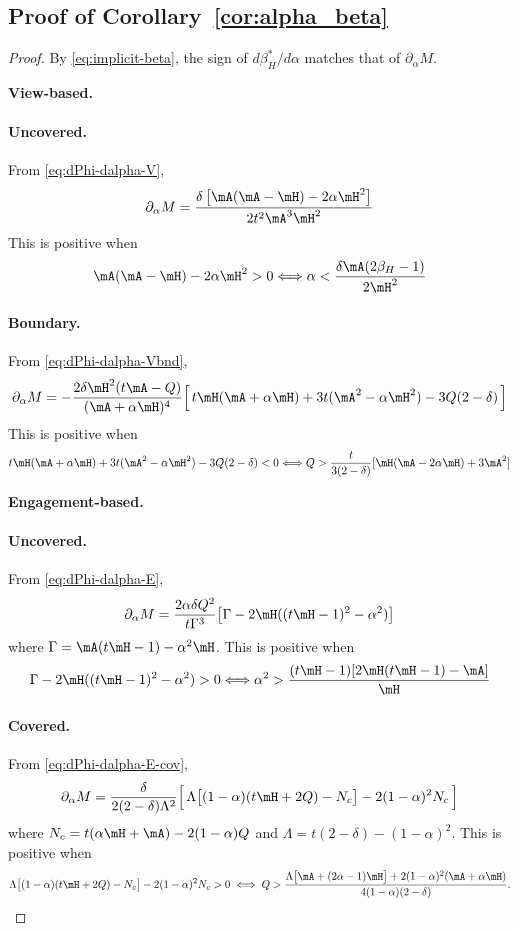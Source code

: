 \subsection*{Proof of Corollary~\ref{cor:alpha_beta}}
\begin{proof}
By \eqref{eq:implicit-beta}, the sign of $d\beta_H^*/d\alpha$ matches
that of $\partial_\alpha M$.


\textbf{View-based.}
\paragraph{Uncovered.} From \eqref{eq:dPhi-dalpha-V},
\[
\partial_\alpha M = \frac{\delta\left[\mA(\mA - \mH) - 2\alpha\mH^2\right]}{2t^2\mA^3\mH^2}
\]
This is positive when
\[
\mA(\mA-\mH) - 2\alpha\mH^2 > 0 \Longleftrightarrow \alpha < \frac{\delta\mA(2\beta_H-1)}{2\mH^2}
\]

\paragraph{Boundary.} From \eqref{eq:dPhi-dalpha-Vbnd},
\[
\partial_\alpha M= -\frac{2\delta\mH^2 (t\mA-Q)}{(\mA+\alpha\mH)^4}\Bigl[\,t\mH(\mA+\alpha\mH)+3t(\mA^2-\alpha\mH^2)-3Q(2-\delta)\,\Bigr]
\]
This is positive when
\[
t\mH(\mA+\alpha\mH)+3t(\mA^2-\alpha\mH^2)-3Q(2-\delta) < 0 \Longleftrightarrow Q > \frac{t}{3(2-\delta)}[\mH(\mA-2\alpha\mH)+3\mA^2]
\]


\textbf{Engagement-based.}
\paragraph{Uncovered.} From \eqref{eq:dPhi-dalpha-E},
\[
\partial_\alpha M=
\frac{2\alpha\delta Q^2}{t\Gamma^3}\bigl[\Gamma - 2\mH((t\mH-1)^2 - \alpha^2)\bigr]
\]
where $\Gamma=\mA(t\mH-1)-\alpha^{2}\mH$. This is positive when
\[
\Gamma - 2\mH((t\mH-1)^2 - \alpha^2) > 0 \Longleftrightarrow \alpha^2 > \frac{(t\mH-1)[2\mH(t\mH-1)-\mA]}{\mH}
\]


\paragraph{Covered.} From \eqref{eq:dPhi-dalpha-E-cov},
\[
\partial_\alpha M=
\frac{\delta}{2(2-\delta)\Lambda^2}\Bigl[\,\Lambda\bigl[(1-\alpha)(t\mH+2Q) - N_c\bigr] - 2(1-\alpha)^2 N_c\,\Bigr]
\]
where $N_c = t(\alpha\mH + \mA) - 2(1-\alpha)Q$ and $\Lambda=t(2-\delta)-(1-\alpha)^{2}$.
This is positive when
\[
\Lambda\bigl[(1-\alpha)(t\mH+2Q) - N_c\bigr] - 2(1-\alpha)^2 N_c>0 \;\Longleftrightarrow\;
Q > \frac{\Lambda\bigl[\mA+(2\alpha-1)\mH\bigr] + 2(1-\alpha)^2(\mA+\alpha\mH)}{4(1-\alpha)(2-\delta)}.
\]


\end{proof}
